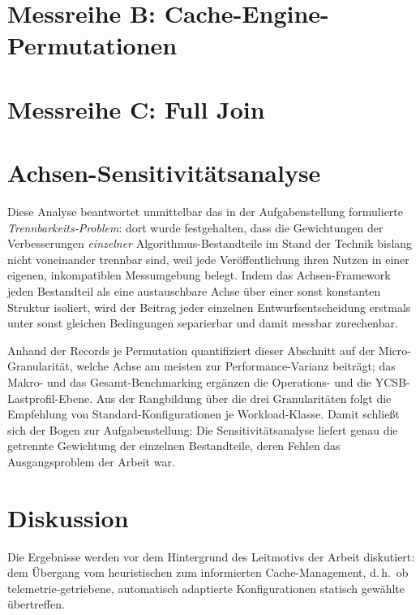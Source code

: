 \section{Messreihe B\@: Cache-Engine-Permutationen}\label{sec:result-b}

% 

\section{Messreihe C\@: Full Join}\label{sec:result-c}

% 

\section{Achsen-Sensitivitätsanalyse}\label{sec:sensitivity}

Diese Analyse beantwortet unmittelbar das in der Aufgabenstellung formulierte
\emph{Trennbarkeits-Problem}: dort wurde festgehalten, dass die Gewichtungen der Verbesserungen
\emph{einzelner} Algorithmus-Bestandteile im Stand der Technik bislang nicht voneinander trennbar
sind, weil jede Veröffentlichung ihren Nutzen in einer eigenen, inkompatiblen Messumgebung belegt.
Indem das Achsen-Framework jeden Bestandteil als eine austauschbare Achse über einer sonst
konstanten Struktur isoliert, wird der Beitrag jeder einzelnen Entwurfsentscheidung erstmals unter
sonst gleichen Bedingungen separierbar und damit messbar zurechenbar.

Anhand der Records je Permutation quantifiziert dieser Abschnitt auf der Micro-Granularität, welche
Achse am meisten zur Performance-Varianz beiträgt; das Makro- und das Gesamt-Benchmarking ergänzen
die Operations- und die YCSB-Lastprofil-Ebene. Aus der Rangbildung über die drei Granularitäten
folgt die Empfehlung von Standard-Konfigurationen je Workload-Klasse. Damit schließt sich der Bogen
zur Aufgabenstellung: Die Sensitivitätsanalyse liefert genau die getrennte Gewichtung der einzelnen
Bestandteile, deren Fehlen das Ausgangsproblem der Arbeit war.

\section{Diskussion}\label{sec:discussion}

Die Ergebnisse werden vor dem Hintergrund des Leitmotivs der Arbeit diskutiert: dem Übergang vom
heuristischen zum informierten Cache-Management, d.\,h.\ ob telemetrie-getriebene, automatisch
adaptierte Konfigurationen statisch gewählte übertreffen.
